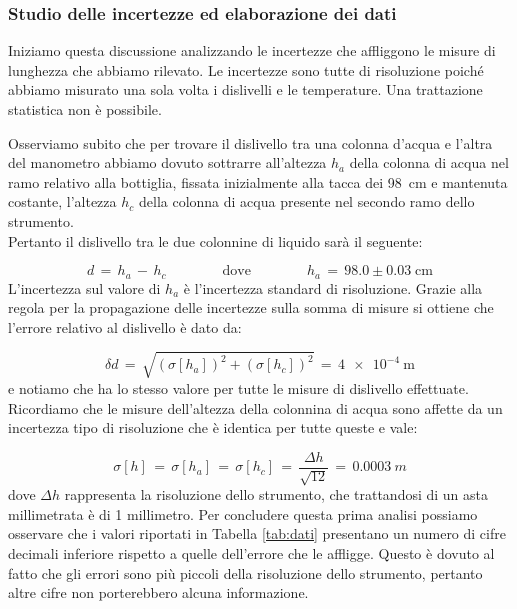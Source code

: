 \subsubsection{Studio delle incertezze ed elaborazione dei dati}
\label{dati_incertezze}

Iniziamo questa discussione analizzando le incertezze che affliggono le misure di lunghezza che abbiamo rilevato. Le incertezze sono tutte di risoluzione poiché abbiamo misurato una sola volta i dislivelli e le temperature. Una trattazione statistica non è possibile.

Osserviamo subito che per trovare il dislivello tra una colonna d'acqua e l'altra del manometro abbiamo dovuto sottrarre all'altezza $h_a$ della colonna di acqua nel ramo relativo alla bottiglia, fissata inizialmente alla tacca dei \SI{98}{\centi\metre} e mantenuta costante, l'altezza $h_c$ della colonna di acqua presente nel secondo ramo dello strumento.\\
Pertanto il dislivello tra le due colonnine di liquido sarà il seguente:

\begin{equation*}
    d \,=\, h_a \,-\, h_c \qquad \qquad \text{dove} \qquad \qquad h_a \,=\, 98.0 \pm 0.03 \; \si{\centi\metre} 
\end{equation*}
%
L'incertezza sul valore di $h_a$ è l'incertezza standard di risoluzione.
Grazie alla regola per la propagazione delle incertezze sulla somma di misure si ottiene che l'errore relativo al dislivello è dato da:

\begin{equation*}
    \delta d \,=\, \sqrt{(\sigma [h_a])^2+(\sigma [h_c])^2} \,=\, \SI{4e-4}{\metre}
\end{equation*}
%
e notiamo che ha lo stesso valore per tutte le misure di dislivello effettuate. Ricordiamo che le misure dell'altezza della colonnina di acqua sono affette da un incertezza tipo di risoluzione che è identica per tutte queste e vale:

\begin{equation*}
	\sigma [h] \,=\, \sigma [h_a] \,=\, \sigma [h_c] \,=\, \frac{\Delta h}{\sqrt{12}} \,=\, \SI{0.0003}{m} 
\end{equation*}
%
dove $\Delta h$ rappresenta la risoluzione dello strumento, che trattandosi di un asta millimetrata è di 1 millimetro. Per concludere questa prima analisi possiamo osservare che i valori riportati in Tabella \ref{tab:dati} presentano un numero di cifre decimali inferiore rispetto a quelle dell'errore che le affligge. Questo è dovuto al fatto che gli errori sono più piccoli della risoluzione dello strumento, pertanto altre cifre non porterebbero alcuna informazione.

